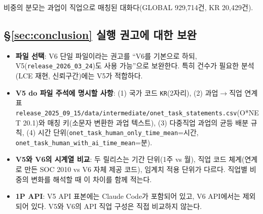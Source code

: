 \documentclass[11pt]{article}
\begin{document}
비중의 분모는 과업이 직업으로 매칭된 대화다(GLOBAL 929,714건, KR 20,429건).

\subsection{\S\ref{sec:conclusion} 실행 권고에 대한 보완}

\begin{itemize}
  \item \textbf{파일 선택}: V6 단일 파일이라는 권고를 ``V6를 기본으로 하되, V5(\texttt{release\_2026\_03\_24})도 사용 가능''으로 보완한다. 특히 건수가 필요한 분석(LCE 재현, 신뢰구간)에는 V5가 적합하다.
  \item \textbf{V5 do 파일 주석에 명시할 사항}: (1) 국가 코드 \texttt{KR}(2자리), (2) 과업$\to$직업 연계표 \texttt{release\_2025\_09\_15/data/intermediate/onet\_task\_statements.csv}(O*NET 20.1)와 매칭 키(소문자 변환한 과업 텍스트), (3) 다중직업 과업의 균등 배분 규칙, (4) 시간 단위(\texttt{onet\_task\_human\_only\_time\_mean}=시간, \texttt{onet\_task\_human\_with\_ai\_time\_mean}=분).
  \item \textbf{V5와 V6의 시계열 비교}: 두 릴리스는 기간 단위(1주 vs 월), 직업 코드 체계(연계로 만든 SOC 2010 vs V6 자체 제공 코드), 임계치 적용 단위가 다르다. 직업별 비중의 변화를 해석할 때 이 차이를 함께 적는다.
  \item \textbf{1P API}: V5 API 표본에는 Claude Code가 포함되어 있고\parencite[p.5]{massenkoff-2026-learning-curves}, V6 API에서는 제외되어 있다. V5와 V6의 API 직업 구성은 직접 비교하지 않는다.
\end{itemize}

\printbibliography[title={참고문헌}]
\end{document}
